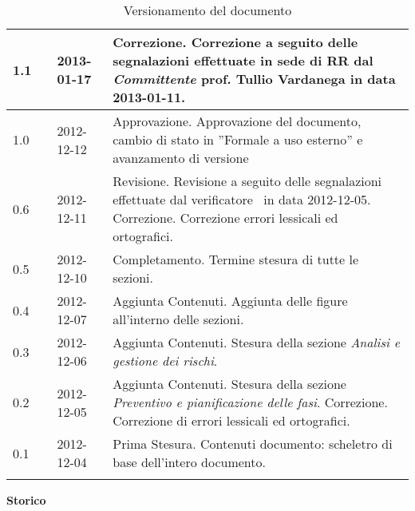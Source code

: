 \begin{longtable}{p{} p{} p{} p{}}
\midrule
1.1	&	\SL &	2013-01-17 	&	Correzione.\newline
						Correzione a seguito delle segnalazioni effettuate in sede di RR dal \textit{Committente} prof. Tullio Vardanega in data 2013-01-11.\\

\midrule
1.0	&	\EZ &	2012-12-12 	&	Approvazione.\newline
						Approvazione del documento, cambio di stato in ”Formale a uso esterno” e avanzamento di versione\\

\midrule
0.6	&	\MB &	2012-12-11 	&	Revisione.\newline
						Revisione a seguito delle segnalazioni effettuate dal verificatore \MB~in data 2012-12-05.\newline
						Correzione.\newline
						Correzione errori lessicali ed ortografici.\\
\midrule
0.5	&	\AB &	2012-12-10 	&	Completamento.\newline
						Termine stesura di tutte le sezioni.\\

\midrule
0.4	&	\VP &	2012-12-07 	&	Aggiunta Contenuti.\newline 
						Aggiunta delle figure all'interno delle sezioni.\\
\midrule
0.3	&	\VP &	2012-12-06 	&	Aggiunta Contenuti.\newline 
						Stesura della sezione \emph{Analisi e gestione dei rischi}.\\

\midrule
0.2	&	\AB &	2012-12-05 	&	Aggiunta Contenuti.\newline 
						Stesura della sezione \emph{Preventivo e pianificazione delle fasi}.\newline
						Correzione.\newline
						Correzione di errori lessicali ed ortografici.\\
\midrule
0.1	&	\AB &	2012-12-04 	&	Prima Stesura.\newline 
						Contenuti documento: scheletro di base dell'intero documento.\\

\bottomrule
\caption{Versionamento del documento}
\end{longtable}

\newpage

\Large{\textbf{Storico }}\\
\normalsize

